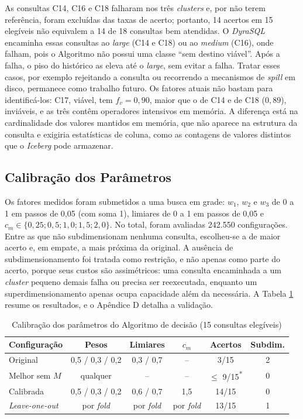 As consultas C14, C16 e C18 falharam nos três \textit{clusters} e, por não terem referência, foram excluídas das taxas de acerto; portanto, 14 acertos em 15 elegíveis não equivalem a 14 de 18 consultas bem atendidas. O \textit{DyraSQL} encaminha essas consultas ao \textit{large} (C14 e C18) ou ao \textit{medium} (C16), onde falham, pois o Algoritmo não possui uma classe ``sem destino viável''. Após a falha, o piso do histórico as eleva até o \textit{large}, sem evitar a falha. Tratar esses casos, por exemplo rejeitando a consulta ou recorrendo a mecanismos de \textit{spill} em disco, permanece como trabalho futuro. Os fatores atuais não bastam para identificá-los: C17, viável, tem $f_v = 0,90$, maior que o de C14 e de C18 ($0,89$), inviáveis, e as três contêm operadores intensivos em memória. A diferença está na cardinalidade dos valores mantidos em memória, que não aparece na estrutura da consulta e exigiria estatísticas de coluna, como as contagens de valores distintos que o \textit{Iceberg} pode armazenar.

\subsection{Calibração dos Parâmetros}
\label{sec:calibracao}

Os fatores medidos foram submetidos a uma busca em grade: $w_1$, $w_2$ e $w_3$ de 0 a 1 em passos de 0,05 (com soma 1), limiares de 0 a 1 em passos de 0,05 e $c_m \in \{0,25; 0,5; 1,0; 1,5; 2,0\}$. No total, foram avaliadas 242.550 configurações. Entre as que não subdimensionam nenhuma consulta, escolheu-se a de maior acerto e, em empate, a mais próxima da original. A ausência de subdimensionamento foi tratada como restrição, e não apenas como parte do acerto, porque seus custos são assimétricos: uma consulta encaminhada a um \textit{cluster} pequeno demais falha ou precisa ser reexecutada, enquanto um superdimensionamento apenas ocupa capacidade além da necessária. A Tabela \ref{tab:calibracao} resume os resultados, e o Apêndice D detalha a validação.

\begin{table}[H]
	\centering
	\caption{Calibração dos parâmetros do Algoritmo de decisão (15 consultas elegíveis)}
	\label{tab:calibracao}
	\begin{tabular}{lccccc}
	\hline
	\textbf{Configuração} & \textbf{Pesos} & \textbf{Limiares} & $c_m$ & \textbf{Acertos} & \textbf{Subdim.} \\
	\hline
	Original & 0,5 / 0,3 / 0,2 & 0,3 / 0,7 & -- & 3/15 & 2 \\
	Melhor sem $M$ & qualquer & -- & -- & $\leq$ 9/15\textsuperscript{*} & 0 \\
	Calibrada & 0,5 / 0,3 / 0,2 & 0,6 / 0,7 & 1,5 & 14/15 & 0 \\
	\textit{Leave-one-out} & por \textit{fold} & por \textit{fold} & por \textit{fold} & 13/15 & 1 \\
	\hline
	\end{tabular}
\end{table}

